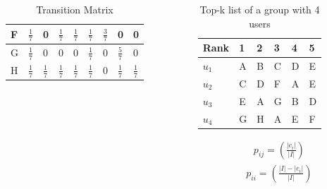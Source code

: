\begin{frame}[t]
\begin{columns}
\begin{column}{0.6\textwidth}
\begin{table}
\begin{tabular}{|l|llllllll|}
		F & $\frac{1}{7}$ & 0 & $\frac{1}{7}$ & $\frac{1}{7}$ & $\frac{1}{7}$ & $\frac{3}{7}$ & 0 & 0 \\\hline
		G & $\frac{1}{7}$ & 0 & 0 & 0 & $\frac{1}{7}$ & 0 & $\frac{5}{7}$ & 0 \\\hline
		H & $\frac{1}{7}$ & $\frac{1}{7}$ & $\frac{1}{7}$ & $\frac{1}{7}$ & $\frac{1}{7}$ & 0 & $\frac{1}{7}$ & $\frac{1}{7}$ \\ \hline
	\end{tabular}
	\caption{Transition Matrix}
\end{table}
\normalsize
\end{column}
\begin{column}{0.5\textwidth}
	\small
	\vspace{-1cm}
	\begin{table}
		\captionsetup{font=footnotesize}
		\begin{tabular}{|l|lllll|} \hline
			Rank  & 1 & 2 & 3 & 4 & 5 \\\hline
			$u_1$ & A & B & C & D & E \\
			$u_2$ & C & D & F & A & E \\
			$u_3$ & E & A & G & B & D \\
			$u_4$ & G & H & A & E & F\\\hline
		\end{tabular}
		\caption{Top-k list of a group with 4 users}
	\end{table}
	\begin{align*}
	p_{ij} = (\frac{|c_i|}{|I|})
	\end{align*}
	\normalsize
	\begin{align*}
	p_{ii} = (\frac{|I|-|c_i|}{|I|})
	\end{align*}
\end{column}
\end{columns}
\end{frame}

